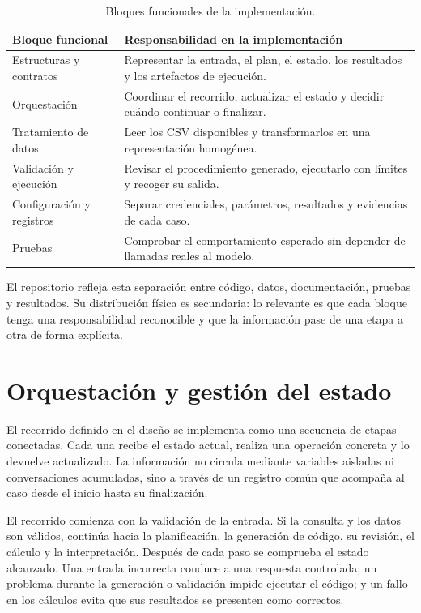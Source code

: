 \begin{table}[H]
\centering
\small
\begin{tabularx}{\textwidth}{L{0.27\textwidth}Y}
\toprule
\textbf{Bloque funcional} & \textbf{Responsabilidad en la implementación} \\
\midrule
Estructuras y contratos & Representar la entrada, el plan, el estado, los resultados y los artefactos de ejecución. \\
Orquestación & Coordinar el recorrido, actualizar el estado y decidir cuándo continuar o finalizar. \\
Tratamiento de datos & Leer los CSV disponibles y transformarlos en una representación homogénea. \\
Validación y ejecución & Revisar el procedimiento generado, ejecutarlo con límites y recoger su salida. \\
Configuración y registros & Separar credenciales, parámetros, resultados y evidencias de cada caso. \\
Pruebas & Comprobar el comportamiento esperado sin depender de llamadas reales al modelo. \\
\bottomrule
\end{tabularx}
\caption{Bloques funcionales de la implementación.}
\label{tab:bloques_implementacion}
\end{table}

El repositorio refleja esta separación entre código, datos, documentación, pruebas y resultados. Su distribución física es secundaria: lo relevante es que cada bloque tenga una responsabilidad reconocible y que la información pase de una etapa a otra de forma explícita.

\section{Orquestación y gestión del estado}

El recorrido definido en el diseño se implementa como una secuencia de etapas conectadas. Cada una recibe el estado actual, realiza una operación concreta y lo devuelve actualizado. La información no circula mediante variables aisladas ni conversaciones acumuladas, sino a través de un registro común que acompaña al caso desde el inicio hasta su finalización.

El recorrido comienza con la validación de la entrada. Si la consulta y los datos son válidos, continúa hacia la planificación, la generación de código, su revisión, el cálculo y la interpretación. Después de cada paso se comprueba el estado alcanzado. Una entrada incorrecta conduce a una respuesta controlada; un problema durante la generación o validación impide ejecutar el código; y un fallo en los cálculos evita que sus resultados se presenten como correctos.

